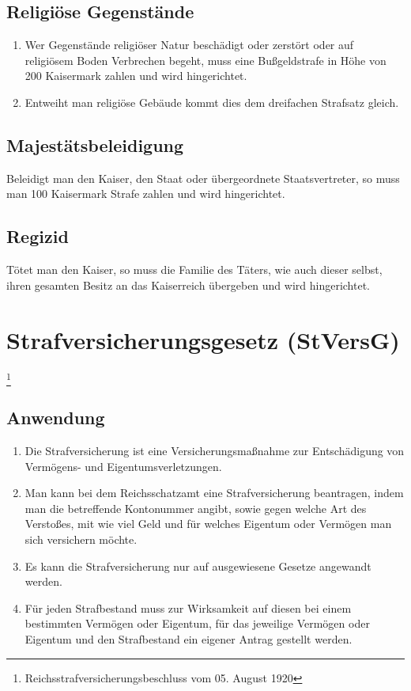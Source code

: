 \documentclass{article}
\begin{document}
\subsection{Religiöse Gegenstände}
\begin{enumerate}[(1)]
    \item Wer Gegenstände religiöser Natur beschädigt oder zerstört oder auf religiösem Boden Verbrechen begeht, muss eine Bußgeldstrafe in Höhe von 200 Kaisermark zahlen und wird hingerichtet.
    \item Entweiht man religiöse Gebäude kommt dies dem dreifachen Strafsatz gleich.
\end{enumerate}

\subsection{Majestätsbeleidigung}
Beleidigt man den Kaiser, den Staat oder übergeordnete Staatsvertreter, so muss man 100 Kaisermark Strafe zahlen und wird hingerichtet.

\subsection{Regizid}
Tötet man den Kaiser, so muss die Familie des Täters, wie auch dieser selbst, ihren gesamten Besitz an das Kaiserreich übergeben und wird hingerichtet.

\section{Strafversicherungsgesetz (StVersG)}\footnote{Reichsstrafversicherungsbeschluss vom 05. August 1920}
\localtableofcontents

\subsection{Anwendung}
\begin{enumerate}[(1)]
    \item Die Strafversicherung ist eine Versicherungsmaßnahme zur Entschädigung von Vermögens- und Eigentumsverletzungen.
    \item Man kann bei dem Reichsschatzamt eine Strafversicherung beantragen, indem man die betreffende Kontonummer angibt, sowie gegen welche Art des Verstoßes, mit wie viel Geld und für welches Eigentum oder Vermögen man sich versichern möchte.
    \item Es kann die Strafversicherung nur auf ausgewiesene Gesetze angewandt werden.
    \item Für jeden Strafbestand muss zur Wirksamkeit auf diesen bei einem bestimmten Vermögen oder Eigentum, für das jeweilige Vermögen oder Eigentum und den Strafbestand ein eigener Antrag gestellt werden.
\end{enumerate}
\end{document}
